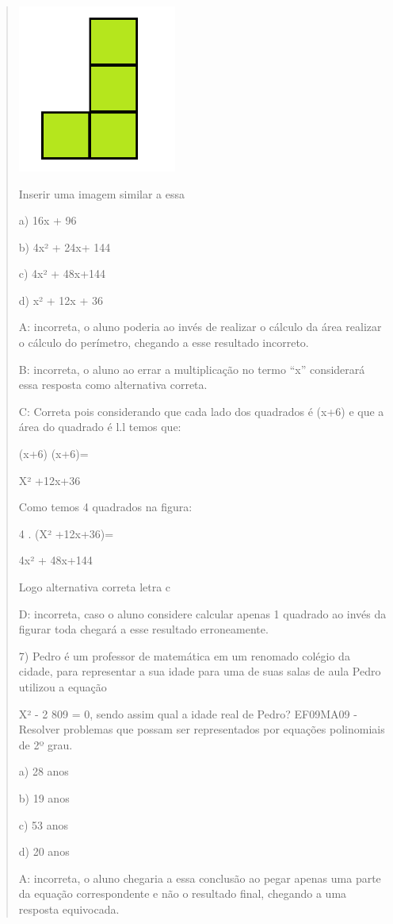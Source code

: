 \begin{quote}
\begin{escolha}
\includegraphics[width=2.05833in,height=2.16573in]{./imgSAEB_8_MAT/media/image57.png}

Inserir uma imagem similar a essa

a) 16x + 96

b) 4x² + 24x+ 144

c) 4x² + 48x+144

d) x² + 12x + 36

A: incorreta, o aluno poderia ao invés de realizar o cálculo da área
realizar o cálculo do perímetro, chegando a esse resultado incorreto.

B: incorreta, o aluno ao errar a multiplicação no termo ``x''
considerará essa resposta como alternativa correta.

C: Correta pois considerando que cada lado dos quadrados é (x+6) e que a
área do quadrado é l.l temos que:

(x+6) (x+6)=

X² +12x+36

Como temos 4 quadrados na figura:

4 . (X² +12x+36)=

4x² + 48x+144

Logo alternativa correta letra c

D: incorreta, caso o aluno considere calcular apenas 1 quadrado ao invés
da figurar toda chegará a esse resultado erroneamente.

7) Pedro é um professor de matemática em um renomado colégio da cidade,
para representar a sua idade para uma de suas salas de aula Pedro
utilizou a equação

X² - 2 809 = 0, sendo assim qual a idade real de Pedro? EF09MA09 -
Resolver problemas que possam ser representados por equações polinomiais
de 2º grau.

a) 28 anos

b) 19 anos

c) 53 anos

d) 20 anos

A: incorreta, o aluno chegaria a essa conclusão ao pegar apenas uma
parte da equação correspondente e não o resultado final, chegando a uma
resposta equivocada.


\end{escolha}
\end{quote}
